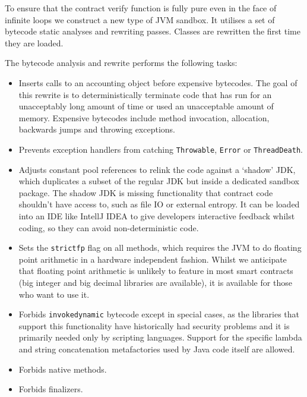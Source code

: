 \documentclass{article}
\begin{document}
To ensure that the contract verify function is fully pure even in the face of infinite loops we construct a new
type of JVM sandbox. It utilises a set of bytecode static analyses and rewriting passes.
Classes are rewritten the first time they are loaded.

The bytecode analysis and rewrite performs the following tasks:

\begin{itemize}
    \item Inserts calls to an accounting object before expensive bytecodes. The goal of this rewrite is to deterministically
    terminate code that has run for an unacceptably long amount of time or used an unacceptable amount of memory. Expensive
    bytecodes include method invocation, allocation, backwards jumps and throwing exceptions.
    \item Prevents exception handlers from catching \texttt{Throwable}, \texttt{Error} or \texttt{ThreadDeath}.
    \item Adjusts constant pool references to relink the code against a `shadow' JDK, which duplicates a subset of the regular
    JDK but inside a dedicated sandbox package. The shadow JDK is missing functionality that contract code shouldn't have access
    to, such as file IO or external entropy. It can be loaded into an IDE like IntellJ IDEA to give developers interactive
    feedback whilst coding, so they can avoid non-deterministic code.
    \item Sets the \texttt{strictfp} flag on all methods, which requires the JVM to do floating point arithmetic in a hardware
    independent fashion. Whilst we anticipate that floating point arithmetic is unlikely to feature in most smart contracts
    (big integer and big decimal libraries are available), it is available for those who want to use it.
    \item Forbids \texttt{invokedynamic} bytecode except in special cases, as the libraries that support this functionality have
    historically had security problems and it is primarily needed only by scripting languages. Support for the specific
    lambda and string concatenation metafactories used by Java code itself are allowed.
    \item Forbids native methods.
    \item Forbids finalizers.
\end{itemize}
\end{document}
